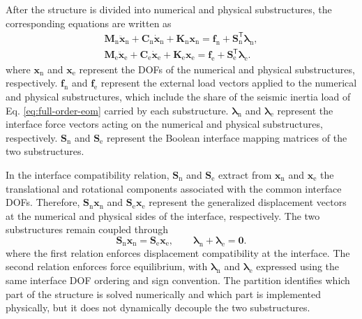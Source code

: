 \documentclass[11pt,a4paper]{article}
\numberwithin{equation}{section}
\begin{document}
After the structure is divided into numerical and physical substructures, the corresponding equations are written as
\begin{subequations}
	\label{eq:substructure-eom}
	\begin{align}
		\mathbf{M}_{\mathrm{n}}\ddot{\bm{x}}_{\mathrm{n}}
		+\mathbf{C}_{\mathrm{n}}\dot{\bm{x}}_{\mathrm{n}}
		+\mathbf{K}_{\mathrm{n}}\bm{x}_{\mathrm{n}}
		=\bm{f}_{\mathrm{n}}+\mathbf{S}_{\mathrm{n}}^{\mathsf{T}}\bm{\lambda}_{\mathrm{n}},
		\label{eq:numerical-eom}\\
		\mathbf{M}_{\mathrm{e}}\ddot{\bm{x}}_{\mathrm{e}}
		+\mathbf{C}_{\mathrm{e}}\dot{\bm{x}}_{\mathrm{e}}
		+\mathbf{K}_{\mathrm{e}}\bm{x}_{\mathrm{e}}
		=\bm{f}_{\mathrm{e}}+\mathbf{S}_{\mathrm{e}}^{\mathsf{T}}\bm{\lambda}_{\mathrm{e}}.
		\label{eq:physical-eom}
	\end{align}
\end{subequations}
where \(\bm{x}_{\mathrm{n}}\) and \(\bm{x}_{\mathrm{e}}\) represent the DOFs of the numerical and physical substructures, respectively. \(\bm{f}_{\mathrm{n}}\) and \(\bm{f}_{\mathrm{e}}\) represent the external load vectors applied to the numerical and physical substructures, which include the share of the seismic inertia load of Eq. \eqref{eq:full-order-eom} carried by each substructure. \(\bm{\lambda}_{\mathrm{n}}\) and \(\bm{\lambda}_{\mathrm{e}}\) represent the interface force vectors acting on the numerical and physical substructures, respectively. \(\mathbf{S}_{\mathrm{n}}\) and \(\mathbf{S}_{\mathrm{e}}\) represent the Boolean interface mapping matrices of the two substructures.

In the interface compatibility relation, \(\mathbf{S}_{\mathrm{n}}\) and \(\mathbf{S}_{\mathrm{e}}\) extract from \(\bm{x}_{\mathrm{n}}\) and \(\bm{x}_{\mathrm{e}}\) the translational and rotational components associated with the common interface DOFs. Therefore, \(\mathbf{S}_{\mathrm{n}}\bm{x}_{\mathrm{n}}\) and \(\mathbf{S}_{\mathrm{e}}\bm{x}_{\mathrm{e}}\) represent the generalized displacement vectors at the numerical and physical sides of the interface, respectively. The two substructures remain coupled through
\begin{equation}
	\mathbf{S}_{\mathrm{n}}\bm{x}_{\mathrm{n}}
	=\mathbf{S}_{\mathrm{e}}\bm{x}_{\mathrm{e}},
	\qquad
	\bm{\lambda}_{\mathrm{n}}+\bm{\lambda}_{\mathrm{e}}=\bm{0}.
	\label{eq:interface-conditions}
\end{equation}
where the first relation enforces displacement compatibility at the interface. The second relation enforces force equilibrium, with \(\bm{\lambda}_{\mathrm{n}}\) and \(\bm{\lambda}_{\mathrm{e}}\) expressed using the same interface DOF ordering and sign convention. The partition identifies which part of the structure is solved numerically and which part is implemented physically, but it does not dynamically decouple the two substructures.
\end{document}
